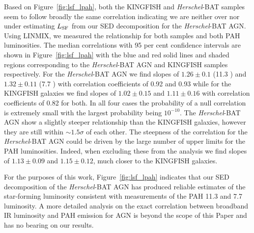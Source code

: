 \documentclass[fleqn, usenatbib]{mnras}
\newcommand{\herschel}{\emph{Herschel}}
\begin{document}
Based on Figure~\ref{fig:lsf_lpah}, both the KINGFISH and \herschel-BAT samples seem to follow broadly the same correlation indicating we are neither over nor under estimating $L_{\rm SF}$ from our SED decomposition for the \herschel-BAT AGN. Using \textsc{LINMIX}, we measured the relationship for both samples and both PAH luminosities. The median correlations with 95 per cent confidence intervals are shown in Figure~\ref{fig:lsf_lpah} with the blue and red solid lines and shaded regions corresponding to the \herschel-BAT AGN and KINGFISH samples respectively. For the \herschel-BAT AGN we find slopes of $1.26\pm0.1$ (11.3 \micron) and $1.32\pm0.11$ (7.7 \micron) with correlation coefficients of 0.92 and 0.93 while for the KINGFISH galaxies we find slopes of $1.02\pm0.15$ and $1.11\pm0.16$ with correlation coefficients of 0.82 for both. In all four cases the probability of a null correlation is extremely small with the largest probability being $10^{-10}$. The \herschel-BAT AGN show a slightly steeper relationship than the KINGFISH galaxies, however they are still within $\sim1.5\sigma$ of each other. The steepness of the correlation for the \herschel-BAT AGN could be driven by the large number of upper limits for the PAH luminosities. Indeed, when excluding these from the analysis we find slopes of $1.13\pm0.09$ and $1.15\pm0.12$, much closer to the KINGFISH galaxies. 

For the purposes of this work, Figure~\ref{fig:lsf_lpah} indicates that our SED decomposition of the \herschel-BAT AGN has produced reliable estimates of the star-forming luminosity consistent with measurements of the PAH 11.3 and 7.7 \micron{} luminosity. A more detailed analysis on the exact correlation between broadband IR luminosity and PAH emission for AGN is beyond the scope of this Paper and has no bearing on our results.




\end{document}
